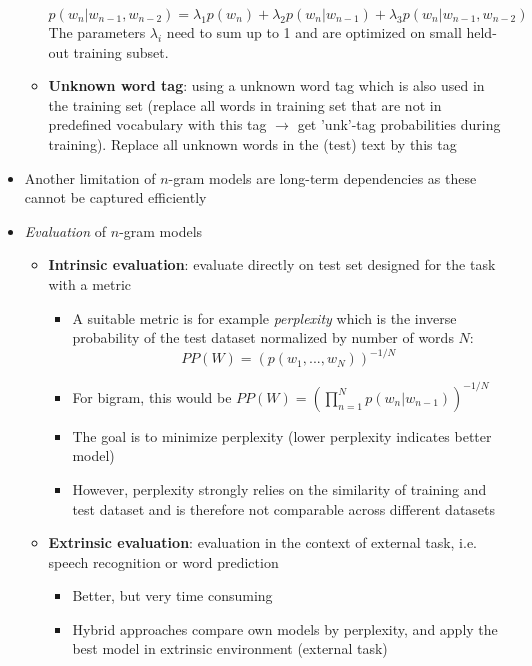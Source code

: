 \begin{itemize}
\begin{itemize}
		$$p(w_n|w_{n-1},w_{n-2}) = \lambda_1 p(w_n) + \lambda_2 p(w_n|w_{n-1}) + \lambda_3 p(w_n|w_{n-1}, w_{n-2})$$
		The parameters $\lambda_i$ need to sum up to 1 and are optimized on small held-out training subset. 
		\item \textbf{Unknown word tag}: using a unknown word tag which is also used in the training set (replace all words in training set that are not in predefined vocabulary with this tag $\rightarrow$ get 'unk'-tag probabilities during training). Replace all unknown words in the (test) text by this tag
	\end{itemize}
	\item Another limitation of $n$-gram models are long-term dependencies as these cannot be captured efficiently
	\item \textit{Evaluation} of $n$-gram models
	\begin{itemize}
		\item \textbf{Intrinsic evaluation}: evaluate directly on test set designed for the task with a metric
		\begin{itemize}
			\item A suitable metric is for example \textit{perplexity} which is the inverse probability of the test dataset normalized by number of words $N$:
			$$PP(W) = \left(p(w_1,...,w_N)\right)^{-1/N}$$
			\item For bigram, this would be $PP(W)=\left(\prod_{n=1}^{N}p(w_n|w_{n-1})\right)^{-1/N}$
			\item The goal is to minimize perplexity (lower perplexity indicates better model)
			\item However, perplexity strongly relies on the similarity of training and test dataset and is therefore not comparable across different datasets
		\end{itemize}
		\item \textbf{Extrinsic evaluation}: evaluation in the context of external task, i.e. speech recognition or word prediction
		\begin{itemize}
			\item Better, but very time consuming
			\item Hybrid approaches compare own models by perplexity, and apply the best model in extrinsic environment (external task)
		\end{itemize}
	\end{itemize}
\end{itemize}
